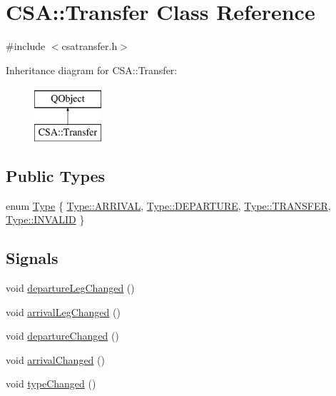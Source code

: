 \hypertarget{classCSA_1_1Transfer}{}\section{C\+SA\+:\+:Transfer Class Reference}
\label{classCSA_1_1Transfer}


{\ttfamily \#include $<$csatransfer.\+h$>$}

Inheritance diagram for C\+SA\+:\+:Transfer\+:\begin{figure}[H]
\begin{center}
\leavevmode
\includegraphics[height=2.000000cm]{classCSA_1_1Transfer}
\end{center}
\end{figure}
\subsection*{Public Types}
\begin{DoxyCompactItemize}
\item 
enum \mbox{\hyperlink{classCSA_1_1Transfer_a827daaa28edc2c4b10ddfa70762355ea}{Type}} \{ \mbox{\hyperlink{classCSA_1_1Transfer_a827daaa28edc2c4b10ddfa70762355eaad5f52d91ac49fd146727f4710767dd08}{Type\+::\+A\+R\+R\+I\+V\+AL}}, 
\mbox{\hyperlink{classCSA_1_1Transfer_a827daaa28edc2c4b10ddfa70762355eaae7cc381a17e714e7ba15ef6f9858304e}{Type\+::\+D\+E\+P\+A\+R\+T\+U\+RE}}, 
\mbox{\hyperlink{classCSA_1_1Transfer_a827daaa28edc2c4b10ddfa70762355eaaeb5ddb3b6096fb90ff720d9c3e2a6628}{Type\+::\+T\+R\+A\+N\+S\+F\+ER}}, 
\mbox{\hyperlink{classCSA_1_1Transfer_a827daaa28edc2c4b10ddfa70762355eaaccc0377a8afbf50e7094f5c23a8af223}{Type\+::\+I\+N\+V\+A\+L\+ID}}
 \}
\end{DoxyCompactItemize}
\subsection*{Signals}
\begin{DoxyCompactItemize}
\item 
void \mbox{\hyperlink{classCSA_1_1Transfer_a6bf33c893850532081dd563cead50e71}{departure\+Leg\+Changed}} ()
\item 
void \mbox{\hyperlink{classCSA_1_1Transfer_ae000de6c0ce8829c7da6a963d9d705ba}{arrival\+Leg\+Changed}} ()
\item 
void \mbox{\hyperlink{classCSA_1_1Transfer_aa7bd4b7ccdba500719b18b0e0f534cb3}{departure\+Changed}} ()
\item 
void \mbox{\hyperlink{classCSA_1_1Transfer_aea7072a6fe1de31c0c783539a879ef73}{arrival\+Changed}} ()
\item 
void \mbox{\hyperlink{classCSA_1_1Transfer_ae404455a073e9bbd3d10fa513c284bb4}{type\+Changed}} ()
\end{DoxyCompactItemize}
